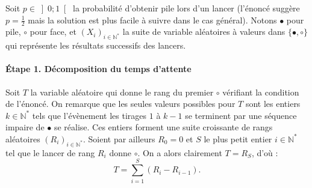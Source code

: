 
\def\pile{\ensuremath{\bullet}}
\def\face{\ensuremath{\circ}}
Soit $p \in \left]0;1\right[$ la probabilité d'obtenir pile lors d'un lancer (l'énoncé suggère $p = \tfrac12$ mais la solution est plus facile à suivre dans le cas général).
Notons \pile{} pour pile, \face{} pour face, et $(X_i)_{i\in \mathbb N^*}$ la suite de variable aléatoires à valeurs dans $\{\pile, \face\}$ qui représente les résultats successifs des lancers.

\paragraph{Étape 1. Décomposition du temps d'attente}
Soit $T$ la variable aléatoire qui donne le rang du premier \face{} vérifiant la condition de l'énoncé. On remarque que les seules valeurs possibles pour $T$ sont les entiers $k \in \mathbb N^*$ tels que l'évènement \og les tirages $1$ à $k-1$ se terminent par une séquence impaire de \pile{} \fg{} se réalise.
Ces entiers forment une suite croissante de rangs aléatoires $(R_i)_{i\in\mathbb N^*}$. Soient par ailleurs $R_0 = 0$ et $S$ le plus petit entier $i \in \mathbb N^*$ tel que le lancer de rang $R_i$ donne \face{}. On a alors clairement $T = R_S$, d'où : 
\[
T = \sum_{i=1}^{S} (R_{i} - R_{i-1}).
\]

